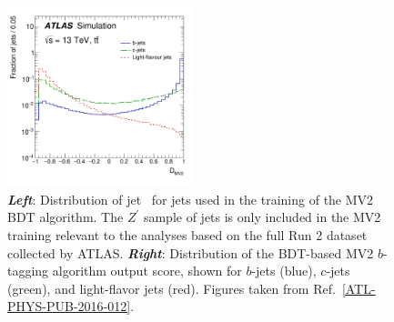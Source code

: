 \begin{figure}[!htb]
    \begin{center}
        \includegraphics[width=0.48\textwidth]{figures/chapter3/ftag/ftag_mv2c10_disc}
        \caption{
            \textbf{\textit{Left}}: Distribution of jet \pT~for jets used in the training of the MV2 BDT algorithm.
                The $Z^{\prime}$ sample of jets is only included in the MV2 training relevant to the analyses
                based on the full Run 2 dataset collected by ATLAS.
            \textbf{\textit{Right}}: Distribution of the BDT-based MV2 $b$-tagging algorithm output score, shown for
                $b$-jets (blue), $c$-jets (green), and light-flavor jets (red).
            Figures taken from Ref.~\ref{ATL-PHYS-PUB-2016-012}.
        }
        \label{fig:ftag_mv2c10_disc}
    \end{center}
\end{figure}



